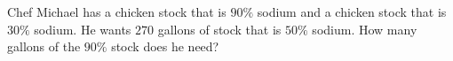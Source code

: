 Chef Michael has a chicken stock that is $90\%$ sodium and a chicken stock that is $30\%$ sodium. He wants $270$ gallons of stock that is $50\%$ sodium. How many gallons of the $90\%$ stock does he need?
